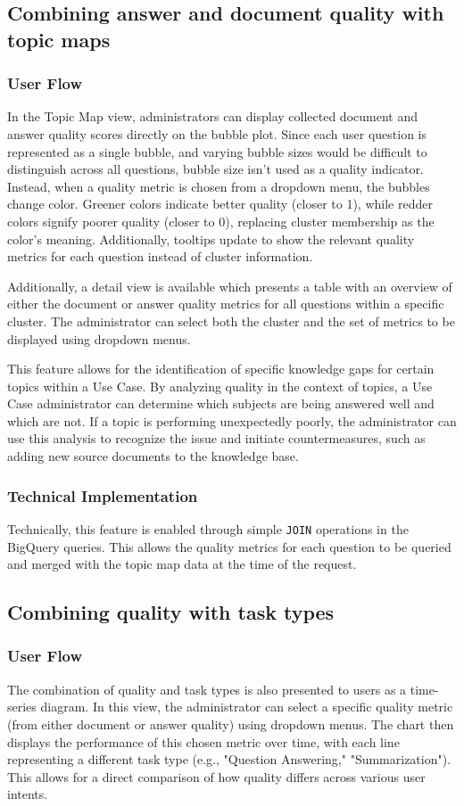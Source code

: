 \documentclass[
	english,
	ruledheaders=section,%
	class=report,%
	thesis={type=bachelor},%
	accentcolor=1b,%
	custommargins=true,%
	marginpar=false,%
	parskip=half-,%
	fontsize=11pt,%
	DIV=14,
]{tudapub}
\begin{document}
\subsection{Combining answer and document quality with topic maps}
\subsubsection{User Flow}
In the Topic Map view, administrators can display collected document and answer quality scores directly on the bubble plot. Since each user question is represented as a single bubble, and varying bubble sizes would be difficult to distinguish across all questions, bubble size isn't used as a quality indicator. Instead, when a quality metric is chosen from a dropdown menu, the bubbles change color. Greener colors indicate better quality (closer to 1), while redder colors signify poorer quality (closer to 0), replacing cluster membership as the color's meaning. Additionally, tooltips update to show the relevant quality metrics for each question instead of cluster information.

Additionally, a detail view is available which presents a table with an overview of either the document or answer quality metrics for all questions within a specific cluster. The administrator can select both the cluster and the set of metrics to be displayed using dropdown menus.

This feature allows for the identification of specific knowledge gaps for certain topics within a Use Case. By analyzing quality in the context of topics, a Use Case administrator can determine which subjects are being answered well and which are not. If a topic is performing unexpectedly poorly, the administrator can use this analysis to recognize the issue and initiate countermeasures, such as adding new source documents to the knowledge base.

\subsubsection{Technical Implementation}
Technically, this feature is enabled through simple \texttt{JOIN} operations in the BigQuery queries. This allows the quality metrics for each question to be queried and merged with the topic map data at the time of the request.
\subsection{Combining quality with task types}
\subsubsection{User Flow}
The combination of quality and task types is also presented to users as a time-series diagram. In this view, the administrator can select a specific quality metric (from either document or answer quality) using dropdown menus. The chart then displays the performance of this chosen metric over time, with each line representing a different task type (e.g., "Question Answering," "Summarization"). This allows for a direct comparison of how quality differs across various user intents.
\end{document}
